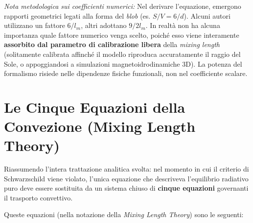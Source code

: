 \textit{Nota metodologica sui coefficienti numerici:} Nel derivare l'equazione, emergono rapporti geometrici legati alla forma del \textit{blob} (es. $S/V = 6/d$). Alcuni autori utilizzano un fattore $6/l_m$, altri adottano $9/2 l_m$. In realtà non ha alcuna importanza quale fattore numerico venga scelto, poiché esso viene interamente \textbf{assorbito dal parametro di calibrazione libera} della \textit{mixing length} (solitamente calibrata affinché il modello riproduca accuratamente il raggio del Sole, o appoggiandosi a simulazioni magnetoidrodinamiche 3D). La potenza del formalismo risiede nelle dipendenze fisiche funzionali, non nel coefficiente scalare.

\section{Le Cinque Equazioni della Convezione (Mixing Length Theory)}

Riassumendo l'intera trattazione analitica svolta: nel momento in cui il criterio di Schwarzschild viene violato, l'unica equazione che descriveva l'equilibrio radiativo puro deve essere sostituita da un sistema chiuso di \textbf{cinque equazioni} governanti il trasporto convettivo.

Queste equazioni (nella notazione della \textit{Mixing Length Theory}) sono le seguenti:

